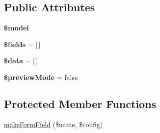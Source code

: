 \subsection*{Public Attributes}
\begin{DoxyCompactItemize}
\item 
\hypertarget{classDMA_1_1Friends_1_1Classes_1_1ActivityForm_afa057e497b595e91ff28b7d82d453a19}{}{\bfseries \$model}\label{classDMA_1_1Friends_1_1Classes_1_1ActivityForm_afa057e497b595e91ff28b7d82d453a19}

\item 
\hypertarget{classDMA_1_1Friends_1_1Classes_1_1ActivityForm_ab9f1445590940a3564581d3481b942c5}{}{\bfseries \$fields} = \mbox{[}$\,$\mbox{]}\label{classDMA_1_1Friends_1_1Classes_1_1ActivityForm_ab9f1445590940a3564581d3481b942c5}

\item 
\hypertarget{classDMA_1_1Friends_1_1Classes_1_1ActivityForm_a7bba50ae9e6c7fe7fd5cbaa8dcf7a976}{}{\bfseries \$data} = \mbox{[}$\,$\mbox{]}\label{classDMA_1_1Friends_1_1Classes_1_1ActivityForm_a7bba50ae9e6c7fe7fd5cbaa8dcf7a976}

\item 
\hypertarget{classDMA_1_1Friends_1_1Classes_1_1ActivityForm_ac7ba33a73e3e8269a24e2b1b37b8778a}{}{\bfseries \$preview\+Mode} = false\label{classDMA_1_1Friends_1_1Classes_1_1ActivityForm_ac7ba33a73e3e8269a24e2b1b37b8778a}

\end{DoxyCompactItemize}
\subsection*{Protected Member Functions}
\begin{DoxyCompactItemize}
\item 
\hyperlink{classDMA_1_1Friends_1_1Classes_1_1ActivityForm_a8e64eb3aac3a88edbbc67700f40f7f61}{make\+Form\+Field} (\$name, \$config)
\end{DoxyCompactItemize}
